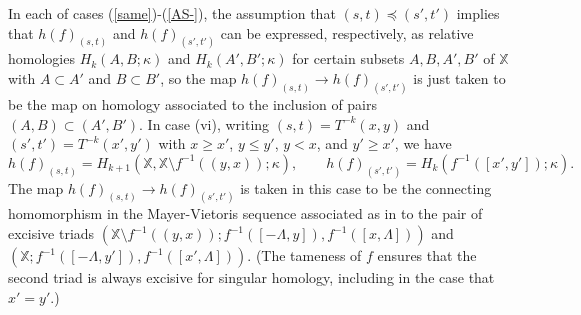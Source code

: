 \documentclass[11pt]{amsart}
\theoremstyle{definition}
\theoremstyle{remark}
\numberwithin{equation}{section}
\begin{document}
 In each of cases (\ref{same})-(\ref{AS-}), the assumption that $(s,t)\preceq (s',t')$ implies that $h(f)_{(s,t)}$ and $h(f)_{(s',t')}$ can be expressed, respectively, as relative homologies $H_k(A,B;\kappa)$ and $H_k(A',B';\kappa)$ for certain subsets $A,B,A',B'$ of $\mathbb{X}$ with $A\subset A'$ and $B\subset B'$, so the map $h(f)_{(s,t)}\to h(f)_{(s',t')}$ is just taken to be the map on homology associated to the inclusion of pairs $(A,B)\subset (A',B')$.  In case (vi), writing $(s,t)=T^{-k}(x,y)$ and $(s',t')=T^{-k}(x',y')$ with $x\geq x'$, $y\leq y'$, $y<x$, and $y'\geq x'$, we have \[ h(f)_{(s,t)}=H_{k+1}(\mathbb{X},\mathbb{X}\setminus f^{-1}((y,x));\kappa),\qquad h(f)_{(s',t')}=H_k(f^{-1}([x',y']);\kappa).\]  The map $h(f)_{(s,t)}\to h(f)_{(s',t')}$ is taken in this case to be the connecting homomorphism in the Mayer-Vietoris sequence associated as in \cite[Section 10.7]{tD} to the pair of excisive triads $\left(\mathbb{X}\setminus f^{-1}((y,x));f^{-1}([-\Lambda,y]),f^{-1}([x,\Lambda])\right)$ and $\left(\mathbb{X};f^{-1}([-\Lambda,y']),f^{-1}([x',\Lambda])\right)$. (The tameness of $f$ ensures that the second triad is always excisive for singular homology, including in the case that $x'=y'$.)
 
\end{document}
